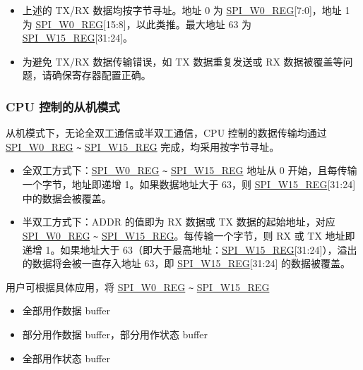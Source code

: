 \documentclass[main\_\_CN.tex]{subfiles}
\begin{document}
\begin{tiplisting}
\vspace{-2em}
\begin{itemize}
    \item 上述的 TX/RX 数据均按字节寻址。地址 0 为 \hyperref[regdesc:SPIW0REG]{SPI\_W0\_REG}[7:0]，地址 1 为 \hyperref[regdesc:SPIW0REG]{SPI\_W0\_REG}[15:8]，以此类推。最大地址 63 为 \hyperref[regdesc:SPIW15REG]{SPI\_W15\_REG}[31:24]。
    \item 为避免 TX/RX 数据传输错误，如 TX 数据重复发送或 RX 数据被覆盖等问题，请确保寄存器配置正确。
\end{itemize}
\end{tiplisting}


\subsubsection{CPU 控制的从机模式} \label{sec:spi-cpu-ctrl-slave}

从机模式下，无论全双工通信或半双工通信，CPU 控制的数据传输均通过 \hyperref[regdesc:SPIW0REG]{SPI\_W0\_REG} \verb+~+ \hyperref[regdesc:SPIW15REG]{SPI\_W15\_REG} 完成，均采用按字节寻址。

\begin{itemize}
    \item 全双工方式下：\hyperref[regdesc:SPIW0REG]{SPI\_W0\_REG} \verb+~+ \hyperref[regdesc:SPIW15REG]{SPI\_W15\_REG} 地址从 0 开始，且每传输一个字节，地址即递增 1。如果数据地址大于 63，则 \hyperref[regdesc:SPIW15REG]{SPI\_W15\_REG}[31:24] 中的数据会被覆盖。
    \item 半双工方式下：ADDR 的值即为 RX 数据或 TX 数据的起始地址，对应 \hyperref[regdesc:SPIW0REG]{SPI\_W0\_REG} \verb+~+ \hyperref[regdesc:SPIW15REG]{SPI\_W15\_REG}。每传输一个字节，则 RX 或 TX 地址即递增 1。如果地址大于 63（即大于最高地址：\hyperref[regdesc:SPIW15REG]{SPI\_W15\_REG}[31:24]），溢出的数据将会被一直存入地址 63，即 \hyperref[regdesc:SPIW15REG]{SPI\_W15\_REG}[31:24] 的数据被覆盖。
\end{itemize}



用户可根据具体应用，将 \hyperref[regdesc:SPIW0REG]{SPI\_W0\_REG} \verb+~+ \hyperref[regdesc:SPIW15REG]{SPI\_W15\_REG}
\begin{itemize}
    \item 全部用作数据 buffer
    \item 部分用作数据 buffer，部分用作状态 buffer
    \item 全部用作状态 buffer
\end{itemize}
\end{document}
